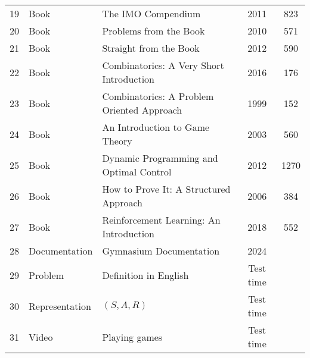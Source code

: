 \begin{table}[htb]
\begin{tabular}{lllcc}
19 & Book & The IMO Compendium \cite{djukic2011imocompendium} & 2011 & 823\\
20 & Book & Problems from the Book \cite{andreescu2010problems} & 2010 & 571\\
21 & Book & Straight from the Book \cite{andreescu2012straight} & 2012 & 590\\
22 & Book & Combinatorics: A Very Short Introduction \cite{wilson2016combinatorics} & 2016 & 176\\
23 & Book & Combinatorics: A Problem Oriented Approach \cite{marcus1999comb} & 1999 & 152\\
24 & Book & An Introduction to Game Theory \cite{osborne2003game} & 2003 & 560\\
25 & Book & Dynamic Programming and Optimal Control \cite{bertsekas2012dp} & 2012 & 1270\\
26 & Book & How to Prove It: A Structured Approach \cite{velleman2006prove} & 2006 & 384\\
27 & Book & Reinforcement Learning: An Introduction \cite{sutton2018reinforcement} & 2018 & 552\\
    \midrule
28 & Documentation & Gymnasium Documentation \cite{gymnasium2024} & 2024 &\\
   \midrule
29 & Problem & Definition in English & Test time &\\
30 & Representation & $(S, A, R)$ & Test time&\\
31 & Video & Playing games & Test time&\\
    \bottomrule
\end{tabular}
\label{tab:data}
\end{table}

